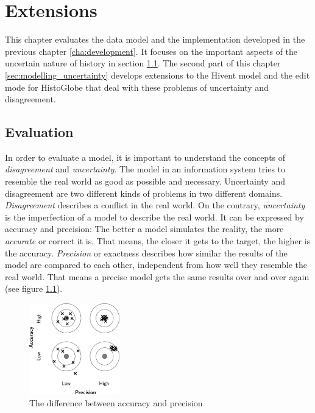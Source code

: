 
\chapter{Extensions} %
\label{cha:extensions}

This chapter evaluates the data model and the implementation developed in the previous chapter \ref{cha:development}. It focuses on the important aspects of the uncertain nature of history in section \ref{sec:evaluation}. The second part of this chapter \ref{sec:modelling_uncertainty} develops extensions to the Hivent model and the edit mode for HistoGlobe that deal with these problems of uncertainty and disagreement.

\section{Evaluation} %
\label{sec:evaluation}

In order to evaluate a model, it is important to understand the concepts of \emph{disagreement} and \emph{uncertainty}. The model in an information system tries to resemble the real world as good as possible and necessary. Uncertainty and disagreement are two different kinds of problems in two different domains.
\emph{Disagreement} describes a conflict in the real world. On the contrary, \emph{uncertainty} is the imperfection of a model to describe the real world. It can be expressed by accuracy and precision: The better a model simulates the reality, the more \emph{accurate} or correct it is. That means, the closer it gets to the target, the higher is the accuracy. \emph{Precision} or exactness describes how similar the results of the model are compared to each other, independent from how well they resemble the real world. That means a precise model gets the same results over and over again (see figure \ref{fig:accuracy_precision}).

\begin{figure}[ht]
  \vspace{1em}
  \centering
  \includegraphics[width = 0.35\textwidth]{graphics/extensions/accuracy_precision}
  \caption{The difference between accuracy and precision}
  \label{fig:accuracy_precision}
\end{figure}


